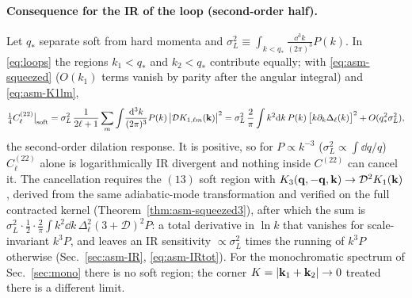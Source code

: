 \paragraph{Consequence for the IR of the loop (second-order half).}  Let $q_*$ separate soft from hard momenta and
$\sigma_L^2\equiv\int_{k<q_*}\frac{\dd^3k}{(2\pi)^3}P(k)$.  In \eqref{eq:loops} the regions $k_1<q_*$ and $k_2<q_*$ contribute equally;
with \eqref{eq:asm-squeezed} ($O(k_1)$ terms vanish by parity after the angular integral) and \eqref{eq:asm-K1lm},
\begin{equation}
\tfrac14C^{(22)}_\ell\big|_{\rm soft}=\sigma_L^2\,\frac1{2\ell+1}\sum_m\int\!\frac{\mathrm d^3k}{(2\pi)^3}P(k)\,\big|\mathcal DK_{1,\ell m}(\mathbf k)\big|^2
=\sigma_L^2\,\frac2\pi\int k^2\mathrm d k\,P(k)\,\big[k\partial_k\Delta_\ell(k)\big]^2+O(q_*^2\sigma_L^2),
\label{eq:asm-IR22}
\end{equation}
the second-order dilation response.  It is positive, so for $P\propto k^{-3}$ ($\sigma_L^2\propto\int\dd q/q$) $C^{(22)}_\ell$ alone is
logarithmically IR divergent and nothing inside $C^{(22)}$ can cancel it.  The cancellation requires the $(13)$ soft region with
$K_3(\mathbf q,-\mathbf q,\mathbf k)\to\mathcal D^2K_1(\mathbf k)$, derived from the same adiabatic-mode transformation and verified on the full contracted kernel
(Theorem~\ref{thm:asm-squeezed3}),
after which the sum is $\sigma_L^2\cdot\tfrac12\cdot\tfrac2\pi\int k^2\dd k\,\Delta_\ell^2(3+\mathcal D)^2P$: a total derivative in $\ln k$ that
vanishes for scale-invariant $k^3P$, and leaves an IR sensitivity $\propto\sigma_L^2$ times the running of $k^3P$ otherwise
(Sec.~\ref{sec:asm-IR}, \eqref{eq:asm-IRtot}).  For the monochromatic spectrum of Sec.~\ref{sec:mono} there is no soft region; the corner $K=|\mathbf k_1+\mathbf k_2|\to0$
treated there is a different limit.


